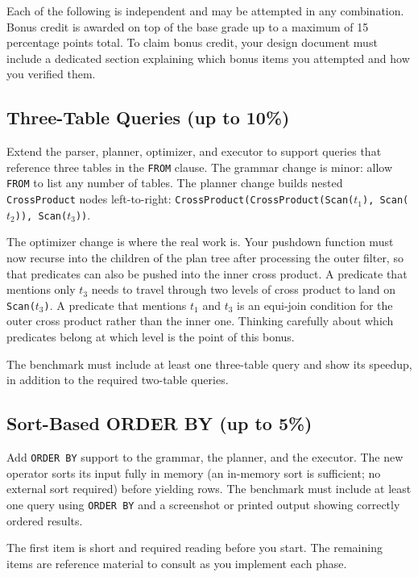 \documentclass[11pt,a4paper]{article}
\begin{document}
Each of the following is independent and may be attempted in any combination. Bonus credit is awarded on top of the base grade up to a maximum of 15 percentage points total. To claim bonus credit, your design document must include a dedicated section explaining which bonus items you attempted and how you verified them.

\subsection{Three-Table Queries (up to 10\%)}
Extend the parser, planner, optimizer, and executor to support queries that reference three tables in the \texttt{FROM} clause. The grammar change is minor: allow \texttt{FROM} to list any number of tables. The planner change builds nested \texttt{CrossProduct} nodes left-to-right: \texttt{CrossProduct(CrossProduct(Scan($t_1$), Scan($t_2$)), Scan($t_3$))}.

The optimizer change is where the real work is. Your pushdown function must now recurse into the children of the plan tree after processing the outer filter, so that predicates can also be pushed into the inner cross product. A predicate that mentions only $t_3$ needs to travel through two levels of cross product to land on \texttt{Scan($t_3$)}. A predicate that mentions $t_1$ and $t_3$ is an equi-join condition for the outer cross product rather than the inner one. Thinking carefully about which predicates belong at which level is the point of this bonus.

The benchmark must include at least one three-table query and show its speedup, in addition to the required two-table queries.

\subsection{Sort-Based ORDER BY (up to 5\%)}
Add \texttt{ORDER BY} support to the grammar, the planner, and the executor. The new operator sorts its input fully in memory (an in-memory sort is sufficient; no external sort required) before yielding rows. The benchmark must include at least one query using \texttt{ORDER BY} and a screenshot or printed output showing correctly ordered results.

The first item is short and required reading before you start. The remaining items are reference material to consult as you implement each phase.
\end{document}
